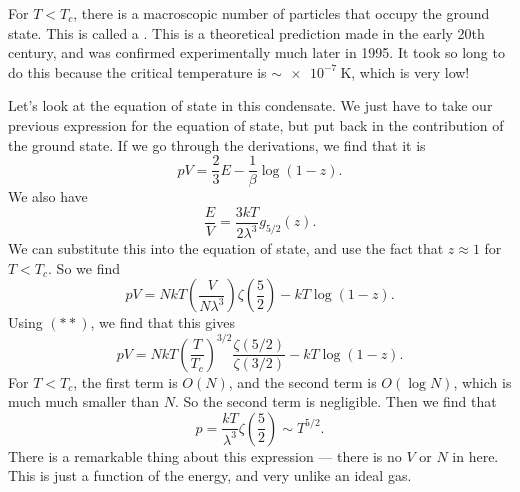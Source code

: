 \documentclass[a4paper]{article}
\begin{document}
For $T < T_c$, there is a macroscopic number of particles that occupy the ground state. This is called a . This is a theoretical prediction made in the early 20th century, and was confirmed experimentally much later in 1995. It took so long to do this because the critical temperature is $\sim \SI{e-7}{\kelvin}$, which is very low!

Let's look at the equation of state in this condensate. We just have to take our previous expression for the equation of state, but put back in the contribution of the ground state. If we go through the derivations, we find that it is
\[
  pV = \frac{2}{3}E - \frac{1}{\beta} \log(1 - z).
\]
We also have
\[
  \frac{E}{V} = \frac{3kT}{2 \lambda^3} g_{5/2}(z).\tag{$\ddagger$}
\]
We can substitute this into the equation of state, and use the fact that $z \approx 1$ for $T < T_c$. So we find
\[
  pV = Nk T \left(\frac{V}{N\lambda^3}\right) \zeta\left(\frac{5}{2}\right) - kT \log(1 - z).
\]
Using $(**)$, we find that this gives
\[
  pV = NkT \left(\frac{T}{T_c}\right)^{3/2} \frac{\zeta(5/2)}{\zeta(3/2)} - kT \log(1 - z).
\]
For $T < T_c$, the first term is $O(N)$, and the second term is $O(\log N)$, which is much much smaller than $N$. So the second term is negligible. Then we find that
\[
  p = \frac{kT}{\lambda^3} \zeta\left(\frac{5}{2}\right) \sim T^{5/2}.
\]
There is a remarkable thing about this expression --- there is no $V$ or $N$ in here. This is just a function of the energy, and very unlike an ideal gas.
\end{document}
